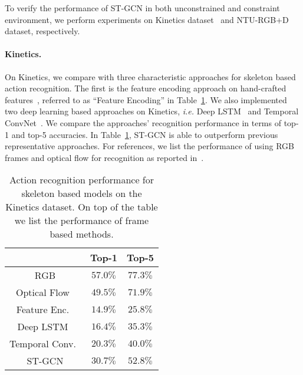 \documentclass[letterpaper]{article} \usepackage{aaai18}  \usepackage{times}  \usepackage{helvet}  \usepackage{courier}  \usepackage{url}  \usepackage{graphicx}
\begin{document}
To verify the performance of ST-GCN in both unconstrained and constraint environment, we perform experiments on Kinetics dataset~\cite{Kay2017Kinetics} and NTU-RGB+D dataset\cite{Shahroudy2016CVPR}, respectively.

\paragraph{Kinetics.}
On Kinetics, we compare with three characteristic approaches for skeleton based action recognition. The first is the feature encoding approach on hand-crafted features~\cite{Fernando2015VideoDarwin}, referred to as ``Feature Encoding'' in Table~\ref{tab:kinetics}. 
We also implemented two deep learning based approaches on Kinetics, \emph{i.e.} Deep LSTM~\cite{Shahroudy2016CVPR} and Temporal ConvNet~\cite{Kim2017CVPRW}.
We compare the approaches' recognition performance in terms of top-1 and top-5 accuracies.
In Table~\ref{tab:kinetics}, ST-GCN is able to outperform previous representative approaches. 
For references, we list the performance of using RGB frames and optical flow for recognition as reported in~\cite{Kay2017Kinetics}.

\begin{table}
	\centering
	\begin{tabular}{c|c|c}
		\hline
		& Top-1 & Top-5 \\ \hline
		RGB\cite{Kay2017Kinetics}				& 	$57.0\%$ &$77.3\%$\\
		Optical Flow~\cite{Kay2017Kinetics}	& 	$49.5\%$ &$71.9\%$ \\\hline
		Feature Enc.~\cite{Fernando2015VideoDarwin}	& $14.9\%$	& $25.8\%$\\
		Deep LSTM~\cite{Shahroudy2016CVPR}		& $16.4\%$	&$35.3\%$  \\
		Temporal Conv.~\cite{Kim2017CVPRW}	& $20.3\%$& $40.0\%$ \\\hline
		ST-GCN 					&  $\mathbf{30.7\%}$& $\mathbf{52.8\%}$ \\\hline
	\end{tabular}
	\caption{Action recognition performance for skeleton based models on the Kinetics dataset.  On top of the table we list the performance of frame based methods. }\label{tab:kinetics}
\end{table}
\end{document}
